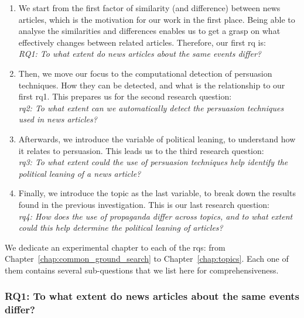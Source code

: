 \begin{enumerate}
    \item We start from the first factor of similarity (and difference) between news articles, which is the motivation for our work in the first place. Being able to analyse the similarities and differences enables us to get a grasp on what effectively changes between related articles. Therefore, our first \acrfull{rq} is:\\
    \emph{RQ1: To what extent do news articles about the same events differ?}
    \item Then, we move our focus to the computational detection of persuasion techniques. How they can be detected, and what is the relationship to our first \acrshort{rq}1. This prepares us for the second research question: \\
    \emph{\acrshort{rq}2: To what extent can we automatically detect the persuasion techniques used in news articles?} 
    \item Afterwards, we introduce the variable of political leaning, to understand how it relates to persuasion. This leads us to the third research question:\\
    \emph{\acrshort{rq}3: To what extent could the use of persuasion techniques help identify the political leaning of a news article?}
    \item Finally, we introduce the topic as the last variable, to break down the results found in the previous investigation. This is our last research question:\\
    \emph{\acrshort{rq}4: How does the use of propaganda differ across topics, and to what extent could this help determine the political leaning of articles?}
\end{enumerate}

We dedicate an experimental chapter to each of the \acrlong{rq}s: from Chapter~\ref{chap:common_ground_search} to Chapter~\ref{chap:topics}.
Each one of them contains several sub-questions that we list here for comprehensiveness.


\subsubsection*{RQ1: To what extent do news articles about the same events differ?}


